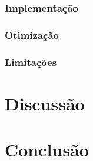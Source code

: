 	\subsubsection{Implementação}
	\label{sec:imple}
	\subsubsection{Otimização}
	\label{sec:opt}
	\subsubsection{Limitações}
	\label{sec:lim}

	\section{Discussão}
	\label{sec:discussao}

	\section{Conclusão}
	\label{sec:conclusao}

	
	

